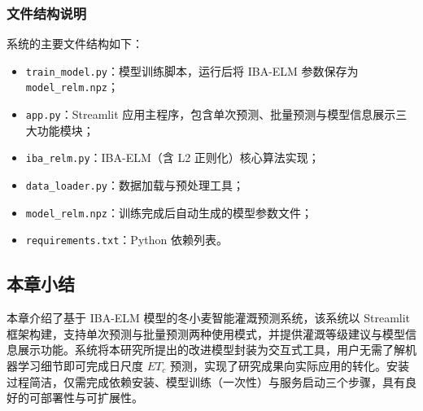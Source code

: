 \documentclass[11pt]{article}
\begin{document}
\subsubsection{文件结构说明}

系统的主要文件结构如下：

\begin{itemize}
  \item \texttt{train\_model.py}：模型训练脚本，运行后将 IBA-ELM 参数保存为 \texttt{model\_relm.npz}；
  \item \texttt{app.py}：Streamlit 应用主程序，包含单次预测、批量预测与模型信息展示三大功能模块；
  \item \texttt{iba\_relm.py}：IBA-ELM（含 L2 正则化）核心算法实现；
  \item \texttt{data\_loader.py}：数据加载与预处理工具；
  \item \texttt{model\_relm.npz}：训练完成后自动生成的模型参数文件；
  \item \texttt{requirements.txt}：Python 依赖列表。
\end{itemize}

\subsection{本章小结}
\label{sec:ch6_summary}

本章介绍了基于 IBA-ELM 模型的冬小麦智能灌溉预测系统，该系统以 Streamlit 框架构建，支持单次预测与批量预测两种使用模式，并提供灌溉等级建议与模型信息展示功能。系统将本研究所提出的改进模型封装为交互式工具，用户无需了解机器学习细节即可完成日尺度 $ET_c$ 预测，实现了研究成果向实际应用的转化。安装过程简洁，仅需完成依赖安装、模型训练（一次性）与服务启动三个步骤，具有良好的可部署性与可扩展性。
\end{document}
